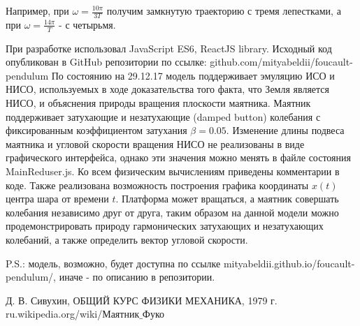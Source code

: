 \documentclass[11pt]{article}
\begin{document}
Например, при $\omega = \frac{10\pi}{3T}$ получим замкнутую траекторию с тремя лепестками, а при $\omega = \frac{14\pi}{T}$ - с четырьмя.



При разработке использовал JavaScript ES6, ReactJS library. Исходный код опубликован в GitHub репозитории по ссылке: github.com/mityabeldii/foucault-pendulum
По состоянию на 29.12.17 модель поддерживает эмуляцию ИСО и НИСО, используемых в ходе доказательства того факта, что Земля является НИСО, и объяснения природы вращения плоскости маятника. Маятник поддерживает затухающие и незатухающие (damped button) колебания с фиксированным коэффициентом затухания $\beta = 0.05$. Изменение длины подвеса маятника и угловой скорости вращения НИСО не реализованы в виде графического интерфейса, однако эти значения можно менять в файле состояния MainReduser.js. Ко всем физическим вычислениям приведены комментарии в коде. Также реализована возможность построения графика координаты $x(t)$ центра шара от времени $t$. Платформа может вращаться, а маятник совершать колебания независимо друг от друга, таким образом на данной модели можно продемонстрировать природу гармонических затухающих и незатухающих колебаний, а также определить вектор угловой скорости.

P.S.: модель, возможно, будет доступна по ссылке mityabeldii.github.io/foucault-pendulum/, иначе - по описанию в репозитории.\\

\begin{thebibliography}{0}
	Д. В. Сивухин, ОБЩИЙ КУРС ФИЗИКИ МЕХАНИКА, 1979 г.
	 ru.wikipedia.org/wiki/Маятник$\_$Фуко
\end{thebibliography}
\end{document}
